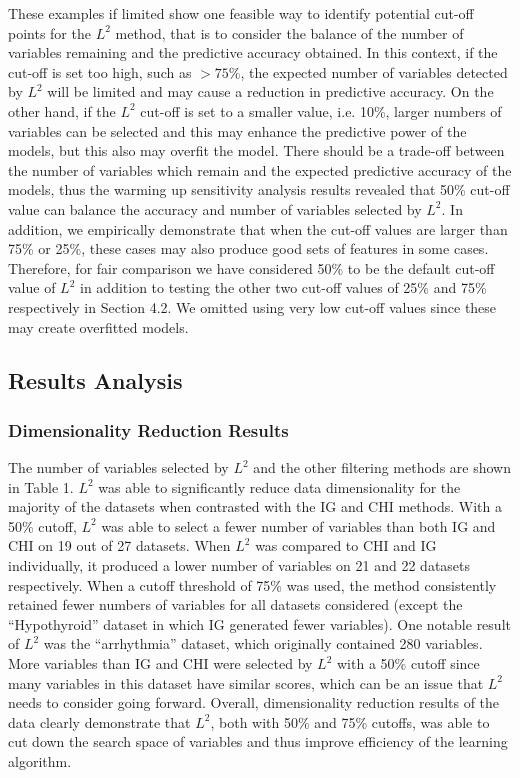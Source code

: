 \documentclass[review]{elsarticle}
\begin{document}
These examples if limited show one feasible way to identify potential cut-off points for the $ L^2 $ method, that is to consider the balance of the number of variables remaining and the predictive accuracy obtained. In this context, if the cut-off is set too high, such as $ > 75\% $, the expected number of variables detected by $ L^2 $ will be limited and may cause a reduction in predictive accuracy. On the other hand, if the $ L^2 $ cut-off is set to a smaller value, i.e. 10\%, larger numbers of variables can be selected and this may enhance the predictive power of the models, but this also may overfit the model. There should be a trade-off between the number of variables which remain and the expected predictive accuracy of the models, thus the warming up sensitivity analysis results revealed that 50\% cut-off value can balance the accuracy and number of variables selected by $ L^2 $.  In addition, we empirically demonstrate that when the cut-off values are larger than 75\% or 25\%, these cases may also produce good sets of features in some cases. Therefore, for fair comparison we have considered 50\% to be the default cut-off value of  $ L^2 $ in addition to testing the other two cut-off values of 25\% and 75\% respectively in Section 4.2. We omitted using very low cut-off values since these may create overfitted models. 

\subsection{Results Analysis }

\subsubsection{Dimensionality Reduction Results }

The number of variables selected by $ L^2 $ and the other filtering methods are shown in Table 1. $ L^2 $ was able to significantly reduce data dimensionality for the majority of the datasets when contrasted with the IG and CHI methods. With a 50\% cutoff, $ L^2 $ was able to select a fewer number of variables than both IG and CHI on 19 out of 27 datasets. When $ L^2 $ was compared to CHI and IG individually, it produced a lower number of variables on 21 and 22 datasets respectively. When a cutoff threshold of 75\% was used, the method consistently retained fewer numbers of variables for all datasets considered (except the “Hypothyroid” dataset in which IG generated fewer variables). One notable result of $ L^2 $ was the “arrhythmia” dataset, which originally contained 280 variables. More variables than IG and CHI were selected by $ L^2 $ with a 50\% cutoff since many variables in this dataset have similar scores, which can be an issue that $ L^2 $ needs to consider going forward. Overall, dimensionality reduction results of the data clearly demonstrate that $ L^2 $, both with 50\% and 75\% cutoffs, was able to cut down the search space of variables and thus improve efficiency of the learning algorithm.
\end{document}
